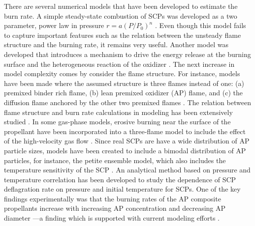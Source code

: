 \documentclass[colorinlistoftodos,review]{elsarticle}
\begin{document}
There are several numerical models that have been developed to estimate the burn rate.
A simple steady-state combustion of SCPs was developed as a two parameter, power law in pressure $r=a(P/P_0)^n$ \cite{summerfield1960burning}. 
Even though this model fails to capture important features such as the relation between the unsteady flame structure and the burning rate, it remains very useful.
Another model was developed that introduces a mechanism to drive the energy release at the burning surface and the heterogeneous reaction of the oxidizer \cite{hermance1967detailed}.
The next increase in model complexity comes by consider the flame structure.
For instance, models have been made where the assumed structure is three flames instead of one: (a) premixed binder rich flame, (b) lean premixed oxidizer (AP) flame, and (c) the diffusion flame anchored by the other two premixed flames \cite{beckstead1970model, glick1975steady, cohen1982improved}.
The relation between flame structure and burn rate calculations in modeling has been extensively studied \cite{isert2017relationship,gross2011steady,bojko2019investigating}.
In some gas-phase models, erosive burning near the surface of the propellant have been incorporated into a three-flame model to include the effect of the high-velocity gas flow \cite{king1978model,cai2008model}.
Since real SCPs are have a wide distribution of AP particle sizes, models have been created to include a bimodal distribution of AP particles, for instance, the petite ensemble model, which also includes the temperature sensitivity of the SCP \cite{renie1979oxidizer}.
An analytical method based on pressure and temperature correlation has been developed to study the dependence of SCP deflagration rate on pressure and initial temperature \cite{price1979steady} for SCPs.
One of the key findings experimentally was that the burning rates of the AP composite propellants increase with increasing AP concentration and decreasing AP diameter \cite{ thomas2020comprehensive}---a finding which is supported with current modeling efforts \cite{gross2015towards}.
\end{document}
